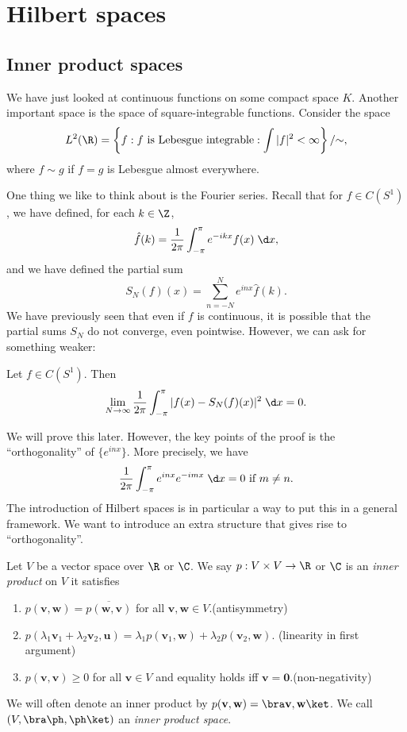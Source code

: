 \documentclass[a4paper]{article}
\begin{document}
\section{Hilbert spaces}
\subsection{Inner product spaces}
We have just looked at continuous functions on some compact space $K$. Another important space is the space of square-integrable functions. Consider the space
\[
  L^2(\R) = \left\{f: f\text{ is Lebesgue integrable} : \int |f|^2 < \infty\right\} / {\sim},
\]
where $f \sim g$ if $f = g$ is Lebesgue almost everywhere.

One thing we like to think about is the Fourier series. Recall that for $f \in C(S^1)$, we have defined, for each $k \in \Z$,
\[
  \hat{f}(k) = \frac{1}{2\pi} \int_{-\pi}^\pi e^{-ikx}f(x)\;\d x,
\]
and we have defined the partial sum
\[
  S_N(f)(x) = \sum_{n = -N}^N e^{inx} \hat{f}(k).
\]
We have previously seen that even if $f$ is continuous, it is possible that the partial sums $S_N$ do not converge, even pointwise. However, we can ask for something weaker:

\begin{prop}
  Let $f \in C(S^1)$. Then
  \[
    \lim_{N \to \infty} \frac{1}{2\pi}\int_{-\pi}^\pi |f(x) - S_N(f)(x)|^2 \;\d x = 0.
  \]
\end{prop}
We will prove this later. However, the key points of the proof is the ``orthogonality'' of $\{e^{inx}\}$. More precisely, we have
\[
  \frac{1}{2\pi} \int_{-\pi}^\pi e^{inx}e^{-imx} \;\d x = 0\text{ if } m\not= n.
\]
The introduction of Hilbert spaces is in particular a way to put this in a general framework. We want to introduce an extra structure that gives rise to ``orthogonality''.

\begin{defi}
  Let $V$ be a vector space over $\R$ or $\C$. We say $p: V \times V \to \R$ or $\C$ is an \emph{inner product} on $V$ it satisfies
  \begin{enumerate}
    \item $p(\mathbf{v}, \mathbf{w}) = \overline{p(\mathbf{w}, \mathbf{v})}$ for all $\mathbf{v}, \mathbf{w} \in V$.\hfill(antisymmetry)
    \item $p(\lambda_1 \mathbf{v}_1 + \lambda_2 \mathbf{v}_2, \mathbf{u}) = \lambda_1 p(\mathbf{v}_1, \mathbf{w}) + \lambda_2 p(\mathbf{v}_2, \mathbf{w})$. \hfill(linearity in first argument)
    \item $p(\mathbf{v}, \mathbf{v}) \geq 0$ for all $\mathbf{v} \in V$ and equality holds iff $\mathbf{v} = \mathbf{0}$.\hfill(non-negativity)
  \end{enumerate}
  We will often denote an inner product by $p(\mathbf{v}, \mathbf{w}) = \bra \mathbf{v}, \mathbf{w}\ket$. We call $(V, \bra\ph ,\ph \ket)$ an \emph{inner product space}.
\end{defi}
\end{document}
